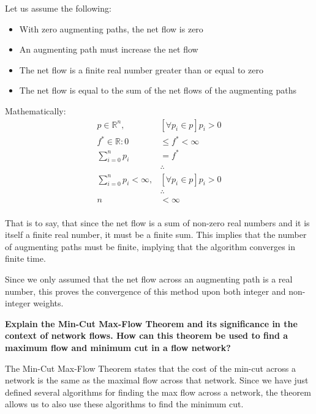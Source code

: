 \documentclass[12pt]{amsart}
\begin{document}
    Let us assume the following:
    \begin{itemize}
        \item With zero augmenting paths, the net flow is zero
        \item An augmenting path must increase the net flow
        \item The net flow is a finite real number greater than
            or equal to zero
        \item The net flow is equal to the sum of the net flows
            of the augmenting paths
    \end{itemize}

    Mathematically:
    \[
    \begin{aligned}
        p \in \mathbb{R}^n , &\left[ \forall p_i \in p \right]
            p_i > 0 \\
        f^* \in \mathbb{R}: 0 &\le f^* < \infty \\
        \sum_{i = 0}^n { p_i } &= f^* \\
        &\therefore \\
        \sum_{i = 0}^n p_i < \infty , &\left[ \forall p_i \in p
            \right] p_i > 0 \\
        &\therefore \\
        n &< \infty \\
    \end{aligned}
    \]

    That is to say, that since the net flow is a sum of non-zero
    real numbers and it is itself a finite real number, it must
    be a finite sum. This implies that the number of augmenting
    paths must be finite, implying that the algorithm converges
    in finite time.

    Since we only assumed that the net flow across an augmenting
    path is a real number, this proves the convergence of this
    method upon both integer and non-integer weights.

    \textbf{Explain the Min-Cut Max-Flow Theorem and its
    significance in the context of network flows. How can this
    theorem be used to find a maximum flow and minimum cut in a
    flow network?}

    The Min-Cut Max-Flow Theorem states that the cost of the
    min-cut across a network is the same as the maximal flow
    across that network. Since we have just defined several
    algorithms for finding the max flow across a network, the
    theorem allows us to also use these algorithms to find the
    minimum cut.
\end{document}

